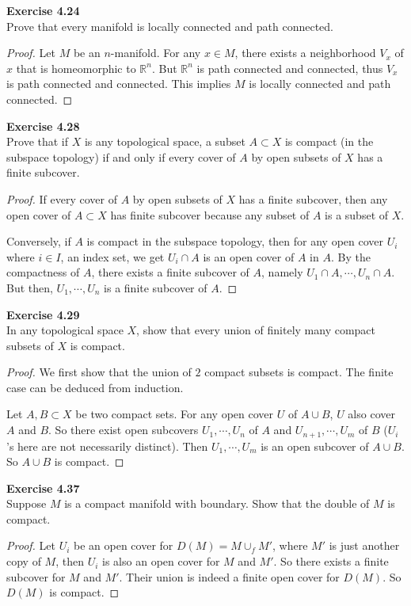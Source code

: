 \documentclass[12pt, a4paper]{article}
\theoremstyle{plain}
\newcommand{\R}{\mathbb{R}}
\newenvironment{exercise}[2][Exercise]
    { \begin{mdframed}[backgroundcolor=gray!20] \textbf{#1 #2} \\}
    {  \end{mdframed}}
\begin{document}
\begin{exercise}{4.24}
Prove that every manifold is locally connected and path connected.
\end{exercise}
	\begin{proof}
	Let $M$ be an $n$-manifold. For any $x\in M$, there exists a neighborhood $V_x$ of $x$ that is homeomorphic to $\R^n$. But $\R^n$ is path connected and connected, thus $V_x$ is path connected and connected. This implies $M$ is locally connected and path connected.
	\end{proof}
	
\begin{exercise}{4.28}
Prove that if $X$ is any topological space, a subset $A\subset X$ is compact (in the subspace topology) if and only if every cover of $A$ by open subsets of $X$ has a finite subcover.
\end{exercise}
	\begin{proof}
	If every cover of $A$ by open subsets of $X$ has a finite subcover, then any open cover of $A\subset X$ has finite subcover because any subset of $A$ is a subset of $X$.
	
	Conversely, if $A$ is compact in the subspace topology, then for any open cover $U_{i}$ where $i\in I$, an index set, we get $U_i\cap A$ is an open cover of $A$ in $A$. By the compactness of $A$, there exists a finite subcover of $A$, namely $U_1\cap A,\cdots, U_n\cap A$. But then, $U_1,\cdots, U_n$ is a finite subcover of $A$. 
	\end{proof}
	
\begin{exercise}{4.29}
In any topological space $X$, show that every union of finitely many compact subsets of $X$ is compact.
\end{exercise}	
	\begin{proof}
	We first show that the union of $2$ compact subsets is compact. The finite case can be deduced from induction. 
	
	Let $A,B\subset X$ be two compact sets. For any open cover $U$ of $A\cup B$, $U$ also cover $A$ and $B$. So there exist open subcovers $U_1,\cdots, U_n$ of $A$ and $U_{n+1},\cdots,U_m$ of $B$ ($U_i$'s here are not necessarily distinct). Then $U_1,\cdots, U_m$ is an open subcover of $A\cup B$. So $A\cup B$ is compact.  
	\end{proof}

\begin{exercise}{4.37}
Suppose $M$ is a compact manifold with boundary. Show that the double of $M$ is compact.
\end{exercise}
	\begin{proof}
	Let $U_i$ be an open cover for $D(M)=M\cup_fM'$, where $M'$ is just another copy of $M$, then $U_i$ is also an open cover for $M$ and $M'$. So there exists a finite subcover for $M$ and $M'$. Their union is indeed a finite open cover for $D(M)$. So $D(M)$ is compact.
	\end{proof}
\end{document}
